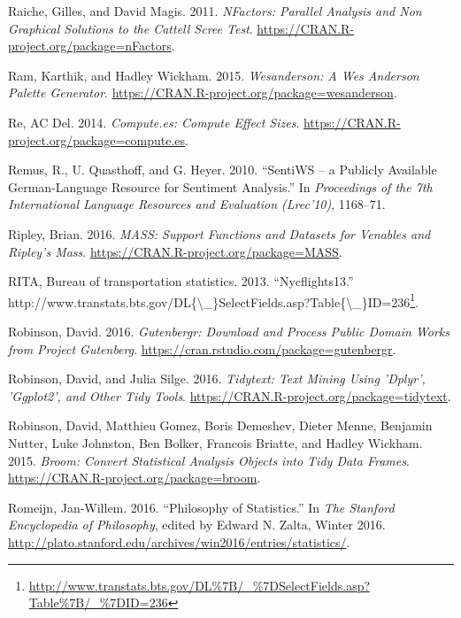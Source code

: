 \documentclass[12pt,]{book}
\renewcommand{\href}[2]{#2\footnote{\url{#1}}}
\begin{document}
\hypertarget{ref-R-nFactors}{}
Raiche, Gilles, and David Magis. 2011. \emph{NFactors: Parallel Analysis
and Non Graphical Solutions to the Cattell Scree Test}.
\url{https://CRAN.R-project.org/package=nFactors}.

\hypertarget{ref-R-wesanderson}{}
Ram, Karthik, and Hadley Wickham. 2015. \emph{Wesanderson: A Wes
Anderson Palette Generator}.
\url{https://CRAN.R-project.org/package=wesanderson}.

\hypertarget{ref-R-compute.es}{}
Re, AC Del. 2014. \emph{Compute.es: Compute Effect Sizes}.
\url{https://CRAN.R-project.org/package=compute.es}.

\hypertarget{ref-remquahey2010}{}
Remus, R., U. Quasthoff, and G. Heyer. 2010. ``SentiWS -- a Publicly
Available German-Language Resource for Sentiment Analysis.'' In
\emph{Proceedings of the 7th International Language Resources and
Evaluation (Lrec'10)}, 1168--71.

\hypertarget{ref-R-MASS}{}
Ripley, Brian. 2016. \emph{MASS: Support Functions and Datasets for
Venables and Ripley's Mass}.
\url{https://CRAN.R-project.org/package=MASS}.

\hypertarget{ref-nycflights13}{}
RITA, Bureau of transportation statistics. 2013. ``Nycflights13.''
\href{http://www.transtats.bts.gov/DL\%7B/_\%7DSelectFields.asp?Table\%7B/_\%7DID=236}{http://www.transtats.bts.gov/DL\{\textbackslash{}\_\}SelectFields.asp?Table\{\textbackslash{}\_\}ID=236}.

\hypertarget{ref-R-gutenbergr}{}
Robinson, David. 2016. \emph{Gutenbergr: Download and Process Public
Domain Works from Project Gutenberg}.
\url{https://cran.rstudio.com/package=gutenbergr}.

\hypertarget{ref-R-tidytext}{}
Robinson, David, and Julia Silge. 2016. \emph{Tidytext: Text Mining
Using 'Dplyr', 'Ggplot2', and Other Tidy Tools}.
\url{https://CRAN.R-project.org/package=tidytext}.

\hypertarget{ref-R-broom}{}
Robinson, David, Matthieu Gomez, Boris Demeshev, Dieter Menne, Benjamin
Nutter, Luke Johnston, Ben Bolker, Francois Briatte, and Hadley Wickham.
2015. \emph{Broom: Convert Statistical Analysis Objects into Tidy Data
Frames}. \url{https://CRAN.R-project.org/package=broom}.

\hypertarget{ref-sep-statistics}{}
Romeijn, Jan-Willem. 2016. ``Philosophy of Statistics.'' In \emph{The
Stanford Encyclopedia of Philosophy}, edited by Edward N. Zalta, Winter
2016.
\url{http://plato.stanford.edu/archives/win2016/entries/statistics/}.
\end{document}
